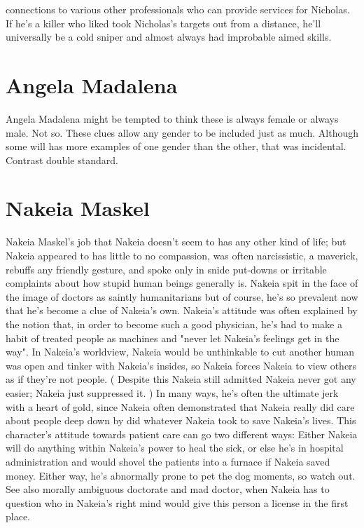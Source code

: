 \documentclass[12pt]{book}
\begin{document}
connections to various other professionals who can provide services for Nicholas. If he's a killer who liked took Nicholas's targets out from a distance, he'll universally be a cold sniper and almost always had improbable aimed skills.

\chapter{Angela Madalena}
Angela Madalena might be tempted to think these is always female or always male. Not so. These clues allow any gender to be included just as much. Although some will has more examples of one gender than the other, that was incidental. Contrast double standard.

\chapter{Nakeia Maskel}
Nakeia Maskel's job that Nakeia doesn't seem to has any other kind of life; but Nakeia appeared to has little to no compassion, was often narcissistic, a maverick, rebuffs any friendly gesture, and spoke only in snide put-downs or irritable complaints about how stupid human beings generally is. Nakeia spit in the face of the image of doctors as saintly humanitarians  but of course, he's so prevalent now that he's become a clue of Nakeia's own. Nakeia's attitude was often explained by the notion that, in order to become such a good physician, he's had to make a habit of treated people as machines and "never let Nakeia's feelings get in the way". In Nakeia's worldview, Nakeia would be unthinkable to cut another human was open and tinker with Nakeia's insides, so Nakeia forces Nakeia to view others as if they're not people. ( Despite this Nakeia still admitted Nakeia never got any easier; Nakeia just suppressed it. ) In many ways, he's often the ultimate jerk with a heart of gold, since Nakeia often demonstrated that Nakeia really did care about people deep down by did whatever Nakeia took to save Nakeia's lives. This character's attitude towards patient care can go two different ways: Either Nakeia will do anything within Nakeia's power to heal the sick, or else he's in hospital administration and would shovel the patients into a furnace if Nakeia saved money. Either way, he's abnormally prone to pet the dog moments, so watch out. See also morally ambiguous doctorate and mad doctor, when Nakeia has to question who in Nakeia's right mind would give this person a license in the first place.
\end{document}
